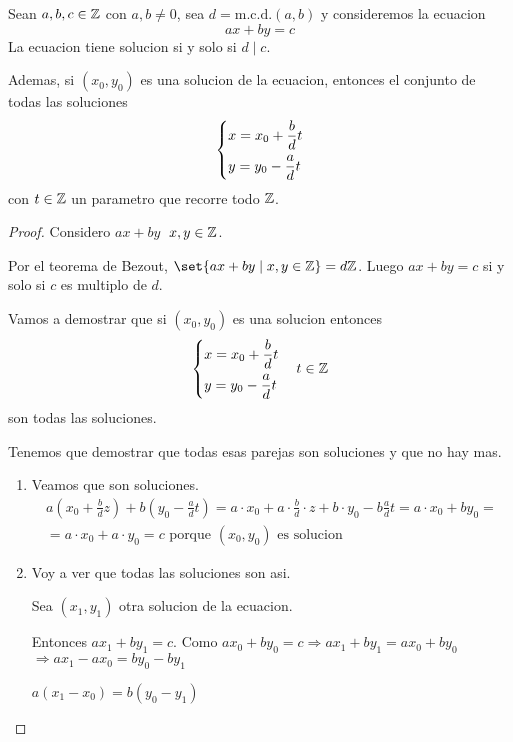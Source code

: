 \begin{theorem}
	Sean \(a,b,c \in \mathbb{Z} \) con \(a,b \neq 0\), sea \(d = \mathrm{m.c.d.}(a,b) \) y consideremos la ecuacion
	\[
		ax + by = c
	\]
	La ecuacion tiene solucion si y solo si \(d \mid c \).
	
	Ademas, si \((x_0, y_0 )\) es una solucion de la ecuacion, entonces el conjunto de todas las soluciones
	\[
		\begin{dcases}
			x = x_0 + \frac{b}{d} t \\
			y = y_0 - \frac{a }{d }t
		\end{dcases}
	\] con \(t \in \mathbb{Z} \) un parametro que recorre todo \(\mathbb{Z} \).
\end{theorem}
\begin{proof}
	Considero \(ax + by \) \(\; x,y \in \mathbb{Z} \).
	
	Por el teorema de Bezout, \(\set{ax + by \mid x,y \in \Z }= d\Z\). Luego \(ax + by = c \) si y solo si \(c \) es multiplo de \(d \).
	
	Vamos a demostrar que si \((x_0,y_0 )\) es una solucion entonces
	\[
		\begin{dcases}
			x = x_0 + \frac{b}{d} t \\
			y = y_0 - \frac{a }{d }t
		\end{dcases} \quad t \in \mathbb{Z}
	\]
	son todas las soluciones.
	
	Tenemos que demostrar que todas esas parejas son soluciones y que no hay mas.
	
	\begin{enumerate}
		\item Veamos que son soluciones.
		      \begin{multline*}
			      a(x_0 + \frac{b}{d}z ) + b (y_0 - \frac{a}{d}t) = a \cdot x_0 + a \cdot \frac{b}{d} \cdot z + b \cdot y_0 - b \frac{a }{d }t = a \cdot x_0 + by_0 = \\
			      = a \cdot x_0 + a \cdot y_0 = c \text{ porque } (x_0, y_0 ) \text{ es solucion}
		      \end{multline*}
		\item Voy a ver que todas las soluciones son asi.
		      
		      Sea \((x_1,y_1 )\) otra solucion de la ecuacion.
		      
		      Entonces \(ax_1 + by_1 = c \). Como \(ax_0 + by_0 = c \Rightarrow ax_1 + by_1 = ax_0 + by_0\) \(\Rightarrow ax_1 - ax_0 = by_0 - by_1 \)
		      
		      \(a(x_1 - x_0) = b(y_0 - y_1 )\)
		      

\end{enumerate}
\end{proof}
